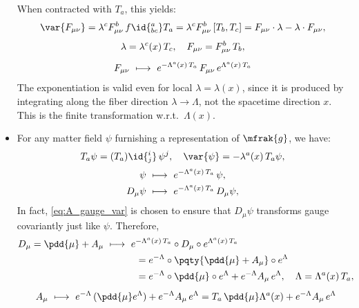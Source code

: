 \documentclass[a4paper,10pt]{article}
\begin{document}
\begin{itemize}
	When contracted with $T_a$, this yields:
	\begin{gather}
		\var{F_{\mu\nu}}
		= \lambda^c F^b_{\mu\nu}\,f\id{^a_{bc}} T_a
		= \lambda^c F^b_{\mu\nu}\,[T_b,T_c]
		= F_{\mu\nu}\cdot\lambda
			- \lambda\cdot F_{\mu\nu},\\[.8ex]
		\lambda = \lambda^c(x)\, T_c,\quad
		F_{\mu\nu} = F^b_{\mu\nu}\, T_b,\\[1.2ex]
		F_{\mu\nu}
		\ \longmapsto\ %
			e^{-\Lambda^a(x)\,T_a}\,F_{\mu\nu}\,
			e^{\Lambda^a(x)\,T_a}
	\end{gather}
	The exponentiation is valid even for local $
		\lambda = \lambda(x)
	$, since it is produced by integrating along the fiber direction $\lambda\to\Lambda$, not the spacetime direction $x$. This is the finite transformation w.r.t.\ $\Lambda(x)$. 
	
	\item For any matter field $\psi$ furnishing a representation of $\mfrak{g}$, we have:
	\begin{gather}
		T_a \psi = (T_a)\id{^i_j}\,\psi^j,\quad
		\var{\psi} = -\lambda^a(x)\,T_a\psi,\\[.5ex]
		\psi
			\ \longmapsto\ %
			e^{-\Lambda^a(x)\,T_a}\,\psi,\\
		D_\mu \psi
			\ \longmapsto\ %
			e^{-\Lambda^a(x)\,T_a}\,D_\mu\psi,
	\end{gather}
	In fact, \eqref{eq:A_gauge_var} is chosen to ensure that $D_\mu \psi$ transforms gauge covariantly just like $\psi$. Therefore, 
	\begin{gather}
	\begin{aligned}
		D_{\mu}
= \pdd{\mu} + A_\mu
		\ &\longmapsto\ %
			e^{-\Lambda^a(x)\,T_a}
			\circ D_{\mu}\circ
			e^{\Lambda^a(x)\,T_a} \\
		&\qquad\quad
		= e^{-\Lambda} \circ \pqty{
				\pdd{\mu} + A_\mu
			} \circ e^\Lambda\\
		&\qquad\quad
		= e^{-\Lambda}
			\circ \pdd{\mu} \circ e^\Lambda
			+ e^{-\Lambda} A_\mu\,e^\Lambda,\quad
		\Lambda = \Lambda^a(x)\,T_a,
	\end{aligned}\\[1ex]
		A_\mu
		\ \longmapsto\ %
			e^{-\Lambda}\,(\pdd{\mu} e^\Lambda)
			+ e^{-\Lambda} A_\mu\,e^\Lambda
		= T_a\,\pdd{\mu} \Lambda^a(x)
			+ e^{-\Lambda} A_\mu\,e^\Lambda
	\end{gather}
	

\end{itemize}
\end{document}
